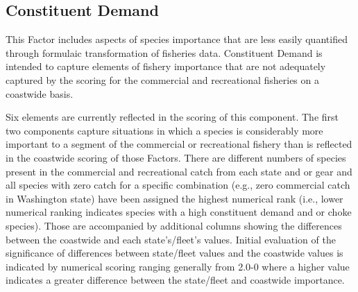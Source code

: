 \documentclass[11pt,
  english,
  a4paper,
]{article}
\begin{document}
\leavevmode\tagmcend\tagstructend\par
\endgroup{}
\endgroup{}


\hypertarget{constituent-demand}{%
\subsection{Constituent Demand}\label{constituent-demand}}

\leavevmode\tagmcend\tagstructend


This Factor includes aspects of species importance that are less easily quantified through formulaic transformation of fisheries data. Constituent Demand is intended to capture elements of fishery importance that are not adequately captured by the scoring for the commercial and recreational fisheries on a coastwide basis.

\leavevmode\tagmcend\tagstructend\par


Six elements are currently reflected in the scoring of this component. The first two components capture situations in which a species is considerably more important to a segment of the commercial or recreational fishery than is reflected in the coastwide scoring of those Factors. There are different numbers of species present in the commercial and recreational catch from each state and or gear and all species with zero catch for a specific combination (e.g., zero commercial catch in Washington state) have been assigned the highest numerical rank (i.e., lower numerical ranking indicates species with a high constituent demand and or choke species). Those are accompanied by additional columns showing the differences between the coastwide and each state's/fleet's values. Initial evaluation of the significance of differences between state/fleet values and the coastwide values is indicated by numerical scoring ranging generally from 2.0-0 where a higher value indicates a greater difference between the state/fleet and coastwide importance.

\leavevmode\tagmcend\tagstructend\par

\end{document}

